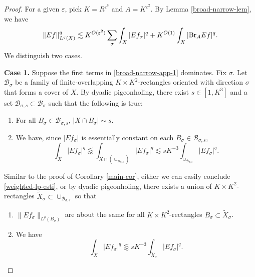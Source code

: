 \documentclass{amsart}
\numberwithin{equation}{section}
\newcommand{\e}{\varepsilon}
\newcommand{\si}{\sigma}
\newcommand{\cb}{\mathcal B}
\newcommand{\wt}{\widetilde}
\newcommand{\BR}{{\rm{Br}}}
\begin{document}
\begin{proof}
For a given $\e$, pick $K=R^{\e^8}$ and $A=K^{\e^2}$.
By Lemma \ref{broad-narrow-lem}, we have
\begin{equation}
\label{broad-narrow-app-1}
    \|Ef\|_{L^q(X)}^q\lesssim K^{O(\e^2)}\sum_\si\int_X|Ef_\si|^q+K^{O(1)}\int_X|\BR_A Ef|^q.
\end{equation}
We distinguish two cases.

\smallskip

{\bf Case 1.} Suppose the first terms in \eqref{broad-narrow-app-1} dominates.
Fix $\si$.
Let $\cb_\si$ be a family of finite-overlapping $K\times K^2$-rectangles oriented with direction $\si$ that forms a cover of $X$.
By dyadic pigeonholing, there exist $s\in[1,K^3]$ and a set $\cb_{\si,s}\subset \cb_\si$ such that the following is true:
\begin{enumerate}
    \item For all $B_\si\in\cb_{\si,s}$, $|X\cap B_\si|\sim s$.
    \item
    We have, since $|Ef_\si|$ is essentially constant on each $B_\si\in\cb_{\si,s}$,
    \begin{equation}
        \int_X|Ef_\si|^q\lessapprox \int_{X\cap (\cup_{\cb_{\si,s}})}|Ef_\si|^q\lesssim sK^{-3}\int_{\cup_{\cb_{\si,s}}}|Ef_\si|^q.
    \end{equation}
\end{enumerate}
Similar to the proof of Corollary \ref{main-cor}, either we can easily conclude \eqref{weighted-lp-esti}, or by dyadic pigeonholing, there exists a union of $K\times K^2$-rectangles $\wt X_\si\subset\cup_{\cb_{\si,s}}$ so that 
\begin{enumerate}
    \item $\|Ef_\si\|_{L^q(B_\si)}$ are about the same for all $K\times K^2$-rectangles $B_\si\subset \wt X_\si$.
    \item We have
    \begin{equation}
    \label{uniform-in-K-rect}
        \int_X|Ef_\si|^q\lessapprox sK^{-3}\int_{\wt X_\si}|Ef_\si|^q.
    \end{equation}
\end{enumerate}



\end{proof}
\end{document}
